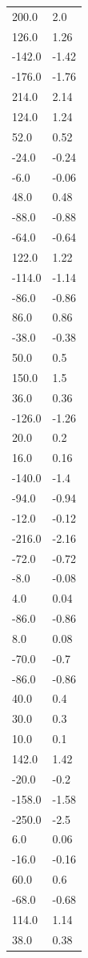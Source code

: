 \begin{longtable}{ll}
200.0 & 2.0 \\
126.0 & 1.26 \\
-142.0 & -1.42 \\
-176.0 & -1.76 \\
214.0 & 2.14 \\
124.0 & 1.24 \\
52.0 & 0.52 \\
-24.0 & -0.24 \\
-6.0 & -0.06 \\
48.0 & 0.48 \\
-88.0 & -0.88 \\
-64.0 & -0.64 \\
122.0 & 1.22 \\
-114.0 & -1.14 \\
-86.0 & -0.86 \\
86.0 & 0.86 \\
-38.0 & -0.38 \\
50.0 & 0.5 \\
150.0 & 1.5 \\
36.0 & 0.36 \\
-126.0 & -1.26 \\
20.0 & 0.2 \\
16.0 & 0.16 \\
-140.0 & -1.4 \\
-94.0 & -0.94 \\
-12.0 & -0.12 \\
-216.0 & -2.16 \\
-72.0 & -0.72 \\
-8.0 & -0.08 \\
4.0 & 0.04 \\
-86.0 & -0.86 \\
8.0 & 0.08 \\
-70.0 & -0.7 \\
-86.0 & -0.86 \\
40.0 & 0.4 \\
30.0 & 0.3 \\
10.0 & 0.1 \\
142.0 & 1.42 \\
-20.0 & -0.2 \\
-158.0 & -1.58 \\
-250.0 & -2.5 \\
6.0 & 0.06 \\
-16.0 & -0.16 \\
60.0 & 0.6 \\
-68.0 & -0.68 \\
114.0 & 1.14 \\
38.0 & 0.38 \\

\end{longtable}
